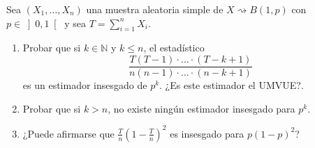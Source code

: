 \begin{ejercicio}
    Sea $(X_1, \ldots, X_n)$ una muestra aleatoria simple de $X\rightsquigarrow B(1,p)$ con $p\in \left]0,1\right[$ y sea $T=\sum\limits_{i=1}^{n}X_i$.
    \begin{enumerate}[label=\alph*)]
        \item Probar que si $k\in \mathbb{N}$ y $k\leq n$, el estadístico
            \begin{equation*}
                \dfrac{T(T-1)\cdot \ldots\cdot (T-k+1)}{n(n-1)\cdot \ldots\cdot (n-k+1)}
            \end{equation*}
            es un estimador insesgado de $p^k$. ¿Es este estimador el UMVUE?.
        \item Probar que si $k>n$, no existe ningún estimador insesgado para $p^k$.
        \item ¿Puede afirmarse que $\frac{T}{n}{\left(1-\frac{T}{n}\right)}^{2}$ es insesgado para $p{(1-p)}^{2}$? 
    \end{enumerate}~\\


\end{ejercicio}
